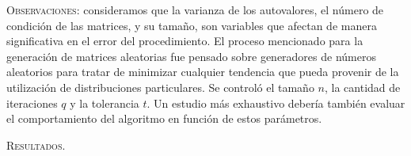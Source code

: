 \vspace{2em}
\noindent \textsc{Observaciones}: consideramos que la varianza de los autovalores, el número de condición de las matrices, y su tamaño, son variables que afectan de manera significativa en el error del procedimiento. El proceso mencionado para la generación de matrices aleatorias fue pensado sobre generadores de números aleatorios para tratar de minimizar cualquier tendencia que pueda provenir de la utilización de distribuciones particulares. Se controló el tamaño $n$, la cantidad de iteraciones $q$ y la tolerancia $t$. Un estudio más exhaustivo debería también evaluar el comportamiento del algoritmo en función de estos parámetros. 


\vspace{2em}
\noindent \textsc{Resultados}. 
